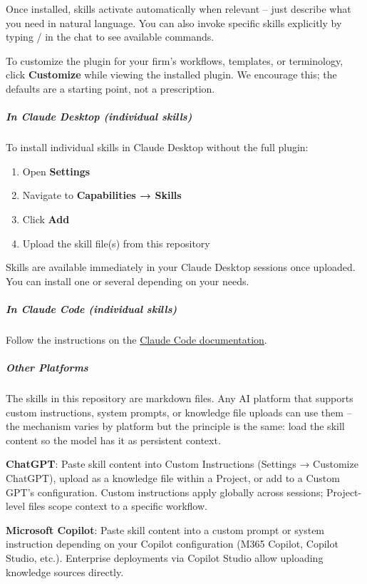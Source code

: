 \documentclass[11pt]{article}
\begin{document}
Once installed, skills activate automatically when relevant – just describe what you need in natural language. You can also invoke specific skills explicitly by typing / in the chat to see available commands.


To customize the plugin for your firm's workflows, templates, or terminology, click \textbf{Customize} while viewing the installed plugin. We encourage this; the defaults are a starting point, not a prescription.


\subparagraph{In Claude Desktop (individual skills)}\mbox{}\par
To install individual skills in Claude Desktop without the full plugin:


\begin{enumerate}[leftmargin=*,itemsep=2pt,topsep=2pt]
\item {} Open \textbf{Settings}
\item {} Navigate to \textbf{Capabilities → Skills}
\item {} Click \textbf{Add}
\item {} Upload the skill file(s) from this repository
\end{enumerate}

Skills are available immediately in your Claude Desktop sessions once uploaded. You can install one or several depending on your needs.


\subparagraph{In Claude Code (individual skills)}\mbox{}\par

Follow the instructions on the \href{https://code.claude.com/docs/en/discover-plugins\#add-from-github}{Claude Code documentation}.


\subparagraph{Other Platforms}\mbox{}\par
The skills in this repository are markdown files. Any AI platform that supports custom instructions, system prompts, or knowledge file uploads can use them – the mechanism varies by platform but the principle is the same: load the skill content so the model has it as persistent context.


\textbf{ChatGPT}: Paste skill content into Custom Instructions (Settings → Customize ChatGPT), upload as a knowledge file within a Project, or add to a Custom GPT's configuration. Custom instructions apply globally across sessions; Project-level files scope context to a specific workflow.


\textbf{Microsoft Copilot}: Paste skill content into a custom prompt or system instruction depending on your Copilot configuration (M365 Copilot, Copilot Studio, etc.). Enterprise deployments via Copilot Studio allow uploading knowledge sources directly.
\end{document}
